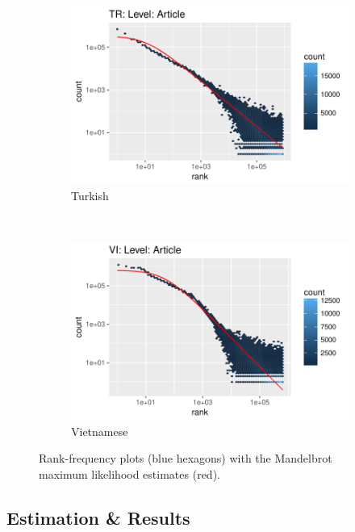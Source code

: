\documentclass{article}
\begin{document}
\begin{figure}
	\begin{subfigure}[b]{0.3\textwidth}
		\includegraphics[trim={0 0 2.2cm 0.6cm},clip, width=\textwidth]{TR_Article_mle.pdf}
		\caption{Turkish}
		\label{fig:tr_mle}
	\end{subfigure}
	~ %
	\begin{subfigure}[b]{0.3\textwidth}
		\includegraphics[trim={0 0 2.2cm 0.6cm},clip, width=\textwidth]{VI_Article_mle.pdf}
		\caption{Vietnamese}
		\label{fig:vi_mle}
	\end{subfigure}
	\caption{Rank-frequency plots (blue hexagons) with the Mandelbrot maximum likelihood estimates (red).}
	\label{fig:mles}
\end{figure}

\subsection{Estimation \& Results}
\end{document}
